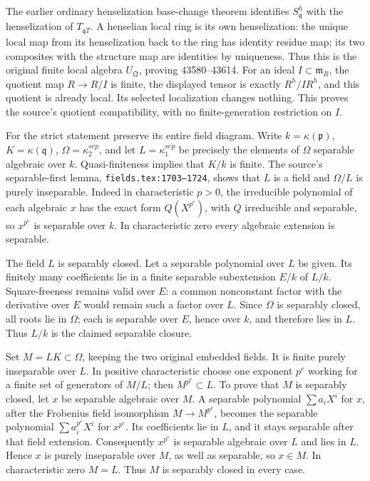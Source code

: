 The earlier ordinary henselization base-change theorem identifies \(S_{\mathfrak q}^h\) with the henselization of \(T_{\mathfrak qT}\). A henselian local ring is its own henselization: the unique local map from its henselization back to the ring has identity residue map; its two composites with the structure map are identities by uniqueness. Thus this is the original finite local algebra \(U_{\mathfrak Q}\), proving 43580--43614. For an ideal \(I\subset\mathfrak m_R\), the quotient map \(R\to R/I\) is finite, the displayed tensor is exactly \(R^h/IR^h\), and this quotient is already local. Its selected localization changes nothing. This proves the source's quotient compatibility, with no finite-generation restriction on \(I\).

For the strict statement preserve its entire field diagram. Write \(k=\kappa(\mathfrak p)\), \(K=\kappa(\mathfrak q)\), \(\Omega=\kappa_2^{sep}\), and let \(L=\kappa_1^{sep}\) be precisely the elements of \(\Omega\) separable algebraic over \(k\). Quasi-finiteness implies that \(K/k\) is finite. The source's separable-first lemma, \texttt{fields.tex:1703–1724}, shows that \(L\) is a field and \(\Omega/L\) is purely inseparable. Indeed in characteristic \(p>0\), the irreducible polynomial of each algebraic \(x\) has the exact form \(Q(X^{p^e})\), with \(Q\) irreducible and separable, so \(x^{p^e}\) is separable over \(k\). In characteristic zero every algebraic extension is separable.

The field \(L\) is separably closed. Let a separable polynomial over \(L\) be given. Its finitely many coefficients lie in a finite separable subextension \(E/k\) of \(L/k\). Square-freeness remains valid over \(E\): a common nonconstant factor with the derivative over \(E\) would remain such a factor over \(L\). Since \(\Omega\) is separably closed, all roots lie in \(\Omega\); each is separable over \(E\), hence over \(k\), and therefore lies in \(L\). Thus \(L/k\) is the claimed separable closure.

Set \(M=LK\subset\Omega\), keeping the two original embedded fields. It is finite purely inseparable over \(L\). In positive characteristic choose one exponent \(p^e\) working for a finite set of generators of \(M/L\); then \(M^{p^e}\subset L\). To prove that \(M\) is separably closed, let \(x\) be separable algebraic over \(M\). A separable polynomial \(\sum a_iX^i\) for \(x\), after the Frobenius field isomorphism \(M\to M^{p^e}\), becomes the separable polynomial \(\sum a_i^{p^e}X^i\) for \(x^{p^e}\). Its coefficients lie in \(L\), and it stays separable after that field extension. Consequently \(x^{p^e}\) is separable algebraic over \(L\) and lies in \(L\). Hence \(x\) is purely inseparable over \(M\), as well as separable, so \(x\in M\). In characteristic zero \(M=L\). Thus \(M\) is separably closed in every case.

